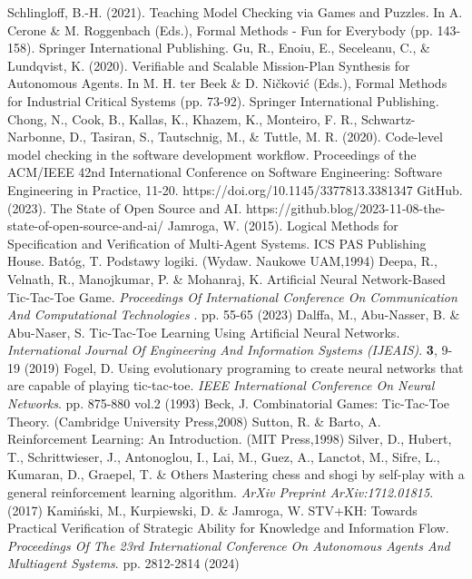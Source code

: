 \documentclass[polish,bachelor,a4paper,oneside]{ppfcmthesis}
\begin{document}
\begin{thebibliography}{1}
   Schlingloff, B.-H. (2021). Teaching Model Checking via Games and Puzzles. In A. Cerone \& M. Roggenbach (Eds.), Formal Methods - Fun for Everybody (pp. 143-158). Springer International Publishing.
    Gu, R., Enoiu, E., Seceleanu, C., \& Lundqvist, K. (2020). Verifiable and Scalable Mission-Plan Synthesis for Autonomous Agents. In M. H. ter Beek \& D. Ničković (Eds.), Formal Methods for Industrial Critical Systems (pp. 73-92). Springer International Publishing.
    Chong, N., Cook, B., Kallas, K., Khazem, K., Monteiro, F. R., Schwartz-Narbonne, D., Tasiran, S., Tautschnig, M., \& Tuttle, M. R. (2020). Code-level model checking in the software development workflow. Proceedings of the ACM/IEEE 42nd International Conference on Software Engineering: Software Engineering in Practice, 11-20. https://doi.org/10.1145/3377813.3381347   
    GitHub. (2023). The State of Open Source and AI. https://github.blog/2023-11-08-the-state-of-open-source-and-ai/
    Jamroga, W. (2015). Logical Methods for Specification and Verification of Multi-Agent Systems. ICS PAS Publishing House.
   Batóg, T. Podstawy logiki. (Wydaw. Naukowe UAM,1994)
   Deepa, R., Velnath, R., Manojkumar, P. \& Mohanraj, K. Artificial Neural Network-Based Tic-Tac-Toe Game. {\em Proceedings Of International Conference On Communication And Computational Technologies }. pp. 55-65 (2023)
   Dalffa, M., Abu-Nasser, B. \& Abu-Naser, S. Tic-Tac-Toe Learning Using Artificial Neural Networks. {\em International Journal Of Engineering And Information Systems (IJEAIS)}. \textbf{3}, 9-19 (2019)
   Fogel, D. Using evolutionary programing to create neural networks that are capable of playing tic-tac-toe. {\em IEEE International Conference On Neural Networks}. pp. 875-880 vol.2 (1993)
   Beck, J. Combinatorial Games: Tic-Tac-Toe Theory. (Cambridge University Press,2008)
   Sutton, R. \& Barto, A. Reinforcement Learning: An Introduction. (MIT Press,1998)
   Silver, D., Hubert, T., Schrittwieser, J., Antonoglou, I., Lai, M., Guez, A., Lanctot, M., Sifre, L., Kumaran, D., Graepel, T. \& Others Mastering chess and shogi by self-play with a general reinforcement learning algorithm. {\em ArXiv Preprint ArXiv:1712.01815}. (2017)
   Kamiński, M., Kurpiewski, D. \& Jamroga, W. STV+KH: Towards Practical Verification of Strategic Ability for Knowledge and Information Flow. {\em Proceedings Of The 23rd International Conference On Autonomous Agents And Multiagent Systems}. pp. 2812-2814 (2024)
\end{thebibliography}


\cleardoublepage\appendix%
\newpage



\ppcolophon
\end{document}
